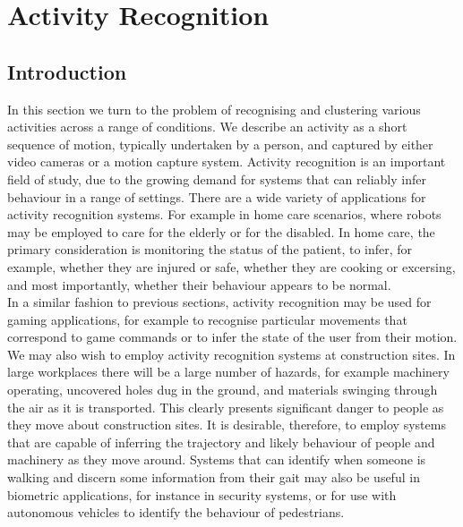 \chapter{Activity Recognition}
\label{activityRecognition}

\section{Introduction}

In this section we turn to the problem of recognising and clustering various activities across a range of conditions. We describe an activity as a short sequence of motion, typically undertaken by a person, and captured by either video cameras or a motion capture system. Activity recognition is an important field of study, due to the growing demand for systems that can reliably infer behaviour in a range of settings. There are a wide variety of applications for activity recognition systems. For example in home care scenarios, where robots may be employed to care for the elderly or for the disabled. In home care, the primary consideration is monitoring the status of the patient, to infer, for example, whether they are injured or safe, whether they are cooking or excersing, and most importantly, whether their behaviour appears to be normal.\\

In a similar fashion to previous sections, activity recognition may be used for gaming applications, for example to recognise particular movements that correspond to game commands or to infer the state of the user from their motion. \\

We may also wish to employ activity recognition systems at construction sites. In large workplaces there will be a large number of hazards, for example machinery operating, uncovered holes dug in the ground, and materials swinging through the air as it is transported. This clearly presents significant danger to people as they move about construction sites. It is desirable, therefore, to employ systems that are capable of inferring the trajectory and likely behaviour of people and machinery as they move around. Systems that can identify when someone is walking and discern some information from their gait may also be useful in biometric applications, for instance in security systems, or for use with autonomous vehicles to identify the behaviour of pedestrians.\\


